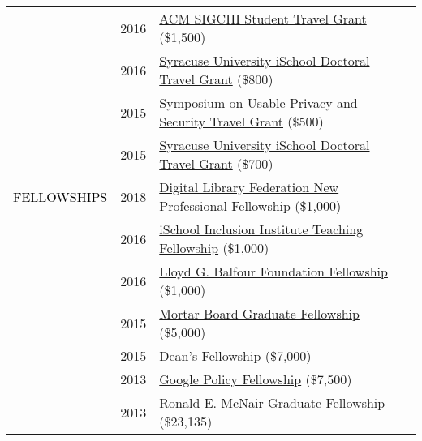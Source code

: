 \documentclass[12pt]{article}
\begin{document}
{{\begin{longtable}{Rp{1.0in}p{0.25in}p{4.75in}}
& \footnotesize{2016} & \href{http://www.sigchi.org/conferences/funding/student-travel-grant}{{ACM SIGCHI Student Travel Grant} }(\$1,500) \\

& \footnotesize{2016} & \href{https://ischool.syr.edu/research/grants-and-awards/}{{Syracuse University iSchool Doctoral Travel Grant}} (\$800) \\

& \footnotesize{2015} & \href{http://cups.cs.cmu.edu/soups/2015/cfp.php}{{Symposium on Usable Privacy and Security Travel Grant}} (\$500) \\

& \footnotesize{2015} & \href{https://ischool.syr.edu/research/grants-and-awards/}{{Syracuse University iSchool Doctoral Travel Grant}} (\$700) \\

\textcolor{black}{\footnotesize{\uppercase{Fellowships}}} & \footnotesize{2018} & \href{https://forum2018.diglib.org/fellowship-opportunities/fellows/}{{Digital Library Federation New Professional Fellowship }}(\$1,000) \\

& \footnotesize{2016} & \href{http://www.sis.pitt.edu/i3/phd-fellows/fellow-profiles.html}{{iSchool Inclusion Institute Teaching Fellowship}} (\$1,000) \\

& \footnotesize{2016} & \href{https://www.bankofamerica.com/philanthropic/foundation.go?fnId=31}{{Lloyd G. Balfour Foundation Fellowship}} (\$1,000) \\

& \footnotesize{2015} & \href{https://news.syr.edu/2015/07/ischool-student-awarded-5000-mortar-board-fellowship-22021/}{{Mortar Board Graduate Fellowship}} (\$5,000) \\

& \footnotesize{2015} & \href{https://news.syr.edu/2012/04/ischool-advisersu-trustee-creates-new-summer-ph-d-fellowships/}{{Dean’s Fellowship}} (\$7,000) \\

& \footnotesize{2013} & \href{https://www.google.com/policyfellowship/2013fellows.html}{{Google Policy Fellowship}} (\$7,500) \\

& \footnotesize{2013} & \href{https://www.syracuse.edu/admissions/cost-and-aid/types-of-aid/graduate-student-aid/fellowships/}{{Ronald E. McNair Graduate Fellowship}} (\$23,135) \\


\end{longtable}}}
\end{document}
